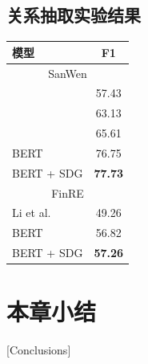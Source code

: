 \subsection{关系抽取实验结果}


\begin{table}[htpb]
    \vspace{0.5em}\centering\wuhao
    \begin{tabular}{lc}
        \toprule[1.5pt]
        模型 & F1 \\
        \midrule[1pt]
        \multicolumn{2}{c}{SanWen} \\
        \hline
        \citet{xu-etal-2020-chinese} & 57.43 \\
        \citet{zhang-yu-2020-chinese} & 63.13 \\
        \citet{li-etal-2019-chinese} & 65.61 \\
        BERT & 76.75 \\
        BERT + SDG & \bf 77.73 \\
        \hline
        \multicolumn{2}{c}{FinRE} \\
        \hline
        Li et al. & 49.26 \\
        BERT & 56.82 \\
        BERT + SDG & \bf 57.26 \\
        \bottomrule[1.5pt]
    \end{tabular}
\end{table}


\section{本章小结}[Conclusions]


